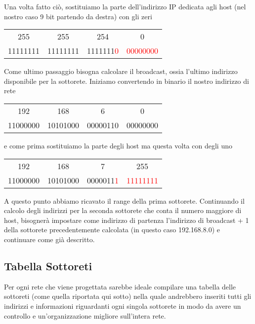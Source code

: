 Una volta fatto ciò, sostituiamo la parte dell'indirizzo IP dedicata agli host (nel nostro caso 9 bit partendo da destra) con gli zeri

\begin{center}
    \begin{tabular}{c@{.}c@{.}c@{.}c}
        255 & 255 & 254 & 0\\
        11111111 & 11111111 & 1111111\textcolor{red}{0} & \textcolor{red}{00000000}
    \end{tabular}
\end{center}

Come ultimo passaggio bisogna calcolare il broadcast, ossia l'ultimo indirizzo disponibile per la sottorete. Iniziamo convertendo in binario il nostro indirizzo di rete

\begin{center}
    \begin{tabular}{c@{.}c@{.}c@{.}c}
        192 & 168 & 6 & 0\\
        11000000 & 10101000 & 00000110 & 00000000
    \end{tabular}
\end{center}

\noindent e come prima sostituiamo la parte degli host ma questa volta con degli uno

\begin{center}
    \begin{tabular}{c@{.}c@{.}c@{.}c}
        192 & 168 & 7 & 255\\
        11000000 & 10101000 & 0000011\textcolor{red}{1} & \textcolor{red}{11111111}
    \end{tabular}
\end{center}

A questo punto abbiamo ricavato il range della prima sottorete. Continuando il calcolo degli indirizzi per la seconda sottorete che conta il numero maggiore di host, bisognerà impostare come indirizzo di partenza l'indirizzo di broadcast + 1 della sottorete precedentemente calcolata (in questo caso 192.168.8.0) e continuare come già descritto.

\subsection{Tabella Sottoreti}
Per ogni rete che viene progettata sarebbe ideale compilare una tabella delle sottoreti (come quella riportata qui sotto) nella quale andrebbero inseriti tutti gli indirizzi e informazioni riguardanti ogni singola sottorete in modo da avere un controllo e un'organizzazione migliore sull'intera rete.

